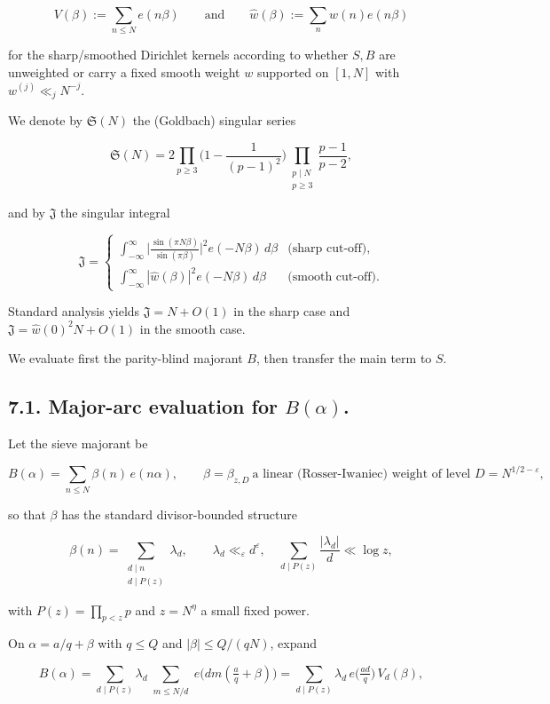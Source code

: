 \documentclass[11pt]{article}
\theoremstyle{definition}
\theoremstyle{remark}
\begin{document}
$$
	V(\beta):=\sum_{n\le N}e(n\beta) \qquad\text{and}\qquad \widehat w(\beta):=\sum_{n}w(n)e(n\beta)
$$

for the sharp/smoothed Dirichlet kernels according to whether $S, B$ are unweighted or carry a fixed smooth weight $w$ supported on $[1,N]$ with $w^{(j)}\ll_j N^{-j}$.

We denote by $\mathfrak S(N)$ the (Goldbach) singular series

$$
	\mathfrak S(N)=2\prod_{p\ge 3}\Big(1-\frac1{(p-1)^2}\Big)
	\prod_{\substack{p\mid N\\ p\ge 3}}\frac{p-1}{p-2},
$$

and by $\mathfrak J$ the singular integral

$$
	\mathfrak J=
	\begin{cases}
		\displaystyle \int_{-\infty}^{\infty}\Big|\frac{\sin(\pi N\beta)}{\sin(\pi\beta)}\Big|^{\!2}e(-N\beta)\,d\beta
		 & \text{(sharp cut-off)},  \\[2ex]
		\displaystyle \int_{-\infty}^{\infty}|\widehat w(\beta)|^{2}e(-N\beta)\,d\beta
		 & \text{(smooth cut-off)}.
	\end{cases}
$$

Standard analysis yields $\mathfrak J=N+O(1)$ in the sharp case and $\mathfrak J=\widehat w(0)^2 N+O(1)$ in the smooth case.

We evaluate first the parity-blind majorant $B$, then transfer the main term to $S$.

\subsection*{7.1. Major-arc evaluation for $B(\alpha)$.}

Let the sieve majorant be

$$
	B(\alpha)=\sum_{n\le N}\beta(n)\,e(n\alpha),\qquad
	\beta=\beta_{z,D}\ \text{a linear (Rosser-Iwaniec) weight of level }D=N^{1/2-\varepsilon},
$$

so that $\beta$ has the standard divisor-bounded structure

$$
	\beta(n)=\sum_{\substack{d\mid n\\ d\mid P(z)}}\lambda_d,\qquad
	\lambda_d\ll_\varepsilon d^\varepsilon,\quad \sum_{d\mid P(z)}\frac{|\lambda_d|}{d}\ll \log z,
$$

with $P(z)=\prod_{p<z}p$ and $z=N^{\eta}$ a small fixed power.

On $\alpha=a/q+\beta$ with $q\le Q$ and $|\beta|\le Q/(qN)$, expand

$$
	B(\alpha)=\sum_{d\mid P(z)}\lambda_d
	\sum_{\substack{m\le N/d}} e\!\big(dm(\tfrac aq+\beta)\big)
	=\sum_{d\mid P(z)}\lambda_d\, e\!\big(\tfrac{ad}{q}\big)\,V_d(\beta),
$$
\end{document}
